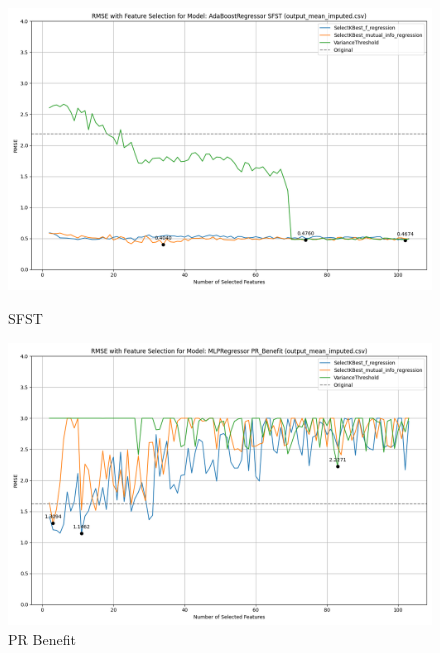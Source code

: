 \begin{figure}[H]
    \centering
    \begin{minipage}{0.45\textwidth}
        \centering
        \includegraphics[width=\linewidth]{reg_section_all/images_reg_featred_graphs/feature_selection_SFST.png}
        \caption{SFST}
        \label{fig:sfst_reg_featred}
    \end{minipage}\hfill
    \begin{minipage}{0.45\textwidth}
        \centering
        \includegraphics[width=\linewidth]{reg_section_all/images_reg_featred_graphs/feature_selection_PR_Benefit.png}
        \caption{PR Benefit}
        \label{fig:pr_ben_reg_featred}
    \end{minipage}
\end{figure}

